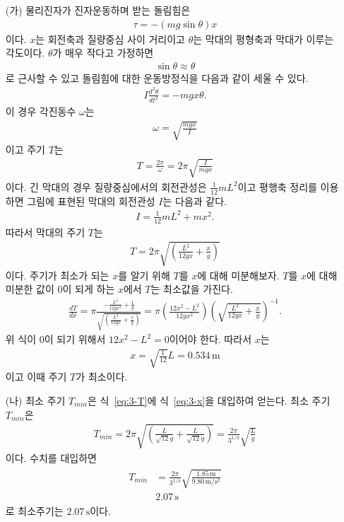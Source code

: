 \documentclass[floatfix,nofootinbib,superscriptaddress,fleqn]{revtex4-2}
\begin{document}
\begin{itemize}
  \item[(가)] 물리진자가 진자운동하며 받는 돌림힘은 
  \begin{align}\label{eq:3-T}
    \tau = -(mg\sin\theta)x
  \end{align}
  이다. $x$는 회전축과 질량중심 사이 거리이고
   $\theta$는 막대의 평형축과 막대가 이루는 각도이다. $\theta$가 매우 작다고 가정하면
   \begin{align}
     \sin\theta \approx \theta
   \end{align}
로 근사할 수 있고 돌림힘에 대한 운동방정식을 다음과 같이 세울 수 있다.
\begin{align}
  I\frac{d^2\theta}{dt^2}=-mgx\theta.
\end{align}
이 경우 각진동수 $\omega$는
\begin{align}
  \omega = \sqrt{\frac{mgx}{I}}
\end{align}
이고 주기 $T$는
\begin{align}
  T = \frac{2\pi}{\omega}=2\pi \sqrt{\frac{I}{mgx}}
\end{align}
이다. 긴 막대의 경우 질량중심에서의 회전관성은 $\frac{1}{12}mL^2$이고 
평행축 정리를 이용하면 그림에 표현된 막대의 회전관성 $I$는 다음과 같다.
\begin{align}
  I = \frac{1}{12}mL^2 + mx^2.
\end{align}
따라서 막대의 주기 $T$는
\begin{align}\label{eq:3-T}
  T = 2\pi \sqrt{\left(\frac{L^2}{12gx} 
  + \frac{x}{g}\right)}
\end{align}
이다. 주기가 최소가 되는 $x$를 알기 위해 $T$를 $x$에 대해 미분해보자.
$T$를 $x$에 대해 미분한 값이 $0$이 되게 하는 $x$에서 $T$는 최소값을 가진다.
\begin{align}
  \frac{dT}{dx} = \pi \frac{-\frac{L^2}{12gx^2}+\frac{1}{g}}
  {\sqrt{\left(\frac{L^2}{12gx} + \frac{x}{g}\right)}}
  =\pi \left(\frac{12x^2-L^2}{12gx^2}\right)
  {\left(\sqrt{\frac{L^2}{12gx} + \frac{x}{g}}\right)}^{-1}.
\end{align}
위 식이 $0$이 되기 위해서 $12x^2-L^2=0$이어야 한다. 따라서 $x$는
\begin{align}\label{eq:3-x}
  x = \sqrt{\frac{1}{12}}L = 0.534\,\mathrm{m}
\end{align}
이고 이때 주기 $T$가 최소이다.
  \item[(나)] 최소 주기 $T_{min}$은 식~\eqref{eq:3-T}에 식~\eqref{eq:3-x}을
  대입하여 얻는다. 최소 주기 $T_{min}$은
  \begin{align}
    T_{min} =  2\pi \sqrt{\left(\frac{L}{\sqrt{12}g} 
    + \frac{L}{\sqrt{12}g}\right)}
    =\frac{2\pi}{3^{1/4}}\sqrt{\frac{L}{g}}
  \end{align}
  이다. 수치를 대입하면
  \begin{align}
    \begin{split}
      T_{min} &= \frac{2\pi}{3^{1/4}}\sqrt{\frac{1.85\,\mathrm{m}}{9.80\,\mathrm{m/s^2}}} \\
      &2.07\,\mathrm{s}
    \end{split}
  \end{align}
  로 최소주기는 $2.07\,\mathrm{s}$이다.
\end{itemize}  
\end{document}

